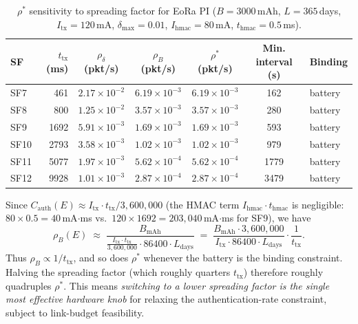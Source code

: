 \begin{table}[ht]
\centering
\caption{%
  $\rho^*$ sensitivity to spreading factor for EoRa PI
  ($B = 3000$\,mAh, $L = 365$\,days, $I_{\mathrm{tx}} = 120$\,mA,
   $\delta_{\max} = 0.01$, $I_{\mathrm{hmac}} = 80$\,mA,
   $t_{\mathrm{hmac}} = 0.5$\,ms).}
\label{tab:sf-sensitivity}
\small
\begin{tabular}{@{}lrccccl@{}}
\toprule
SF & $t_{\mathrm{tx}}$ (ms) & $\rho_\delta$ (pkt/s) & $\rho_B$ (pkt/s) &
   $\rho^*$ (pkt/s) & Min. interval (s) & Binding \\
\midrule
SF7  &   461 & $2.17 \times 10^{-2}$ & $6.19 \times 10^{-3}$ & $6.19 \times 10^{-3}$ &  162 & battery \\
SF8  &   800 & $1.25 \times 10^{-2}$ & $3.57 \times 10^{-3}$ & $3.57 \times 10^{-3}$ &  280 & battery \\
SF9  &  1692 & $5.91 \times 10^{-3}$ & $1.69 \times 10^{-3}$ & $1.69 \times 10^{-3}$ &  593 & battery \\
SF10 &  2793 & $3.58 \times 10^{-3}$ & $1.02 \times 10^{-3}$ & $1.02 \times 10^{-3}$ &  979 & battery \\
SF11 &  5077 & $1.97 \times 10^{-3}$ & $5.62 \times 10^{-4}$ & $5.62 \times 10^{-4}$ & 1779 & battery \\
SF12 &  9928 & $1.01 \times 10^{-3}$ & $2.87 \times 10^{-4}$ & $2.87 \times 10^{-4}$ & 3479 & battery \\
\bottomrule
\end{tabular}
\end{table}

\begin{remark}
\label{rem:sf-scaling}
Since $C_{\mathrm{auth}}(E) \approx I_{\mathrm{tx}} \cdot t_{\mathrm{tx}} / 3{,}600{,}000$
(the HMAC term $I_{\mathrm{hmac}} \cdot t_{\mathrm{hmac}}$ is negligible:
$80 \times 0.5 = 40$\,mA$\cdot$ms vs.\
$120 \times 1692 = 203{,}040$\,mA$\cdot$ms for SF9), we have
\[
  \rho_B(E) \;\approx\;
  \frac{B_{\mathrm{mAh}}}{\tfrac{I_{\mathrm{tx}} \cdot t_{\mathrm{tx}}}{3{,}600{,}000}
  \cdot 86400 \cdot L_{\mathrm{days}}}
  \;=\;
  \frac{B_{\mathrm{mAh}} \cdot 3{,}600{,}000}
       {I_{\mathrm{tx}} \cdot 86400 \cdot L_{\mathrm{days}}}
  \cdot \frac{1}{t_{\mathrm{tx}}}.
\]
Thus $\rho_B \propto 1/t_{\mathrm{tx}}$, and so does $\rho^*$ whenever the
battery is the binding constraint.  Halving the spreading factor (which
roughly quarters $t_{\mathrm{tx}}$) therefore roughly quadruples $\rho^*$.
This means \emph{switching to a lower spreading factor is the single most
effective hardware knob} for relaxing the authentication-rate constraint,
subject to link-budget feasibility.
\end{remark}

